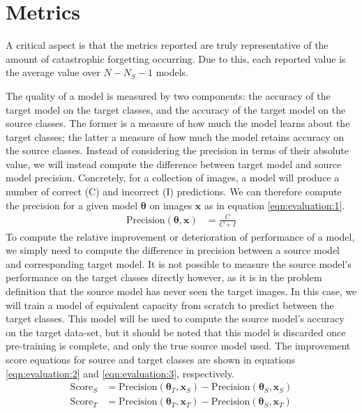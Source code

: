 \documentclass{report}
\begin{document}
	\section{Metrics}
	A critical aspect is that the metrics reported are truly representative of the amount of catastrophic forgetting occurring. Due to this, each reported value is the average value over $N-N_S-1$ models. \par
	The quality of a model is measured by two components: the accuracy of the target model on the target classes, and the accuracy of the target model on the source classes. The former is a measure of how much the model learns about the target classes; the latter a measure of how much the model retains accuracy on the source classes. Instead of considering the precision in terms of their absolute value, we will instead compute the difference between target model and source model precision. Concretely, for a collection of images, a model will produce a number of correct (C) and incorrect (I) predictions. We can therefore compute the precision for a given model $\bm{\theta}$ on images $\bm{x}$ as in equation \ref{eqn:evaluation:1}.
	\begin{align} \label{eqn:evaluation:1}
	\text{Precision}(\bm{\theta}, \bm{x}) &= \frac{C}{C+I}
	\end{align}
	To compute the relative improvement or deterioration of performance of a model, we simply need to compute the difference in precision between a source model and corresponding target model. It is not possible to measure the source model's performance on the target classes directly however, as it is in the problem definition that the source model has never seen the target images. In this case, we will train a model of equivalent capacity from scratch to predict between the target classes. This model will be used to compute the source model's accuracy on the target data-set, but it should be noted that this model is discarded once pre-training is complete, and only the true source model used. The improvement score equations for source and target classes are shown in equations \ref{eqn:evaluation:2} and \ref{eqn:evaluation:3}, respectively.
	\begin{align} \label{eqn:evaluation:2}
	\text{Score}_S &= \text{Precision}(\bm{\theta}_T, \bm{x}_S) - \text{Precision}(\bm{\theta}_S, \bm{x}_S) \\
	\label{eqn:evaluation:3}
	\text{Score}_T &= \text{Precision}(\bm{\theta}_T, \bm{x}_T) - \text{Precision}(\bm{\theta}_S, \bm{x}_T)
	\end{align}
\end{document}
